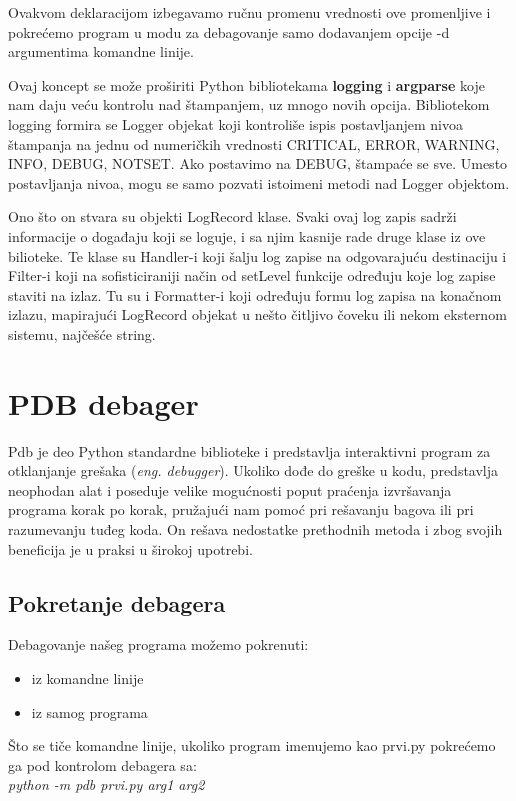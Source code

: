 \documentclass[a4paper]{article}
\begin{document}
Ovakvom deklaracijom izbegavamo ručnu promenu vrednosti ove promenljive i pokrećemo program u modu za debagovanje samo dodavanjem opcije -d argumentima komandne linije. 

Ovaj koncept se može proširiti Python bibliotekama \textbf{logging} \cite{logDocPyt} i \textbf{argparse} koje nam daju veću kontrolu nad štampanjem, uz mnogo novih opcija. Bibliotekom logging formira se Logger objekat koji kontroliše ispis postavljanjem nivoa štampanja na jednu od numeričkih vrednosti CRITICAL, ERROR, WARNING,  INFO, DEBUG, NOTSET. Ako postavimo na DEBUG, štampaće se sve. Umesto postavljanja nivoa, mogu se samo pozvati istoimeni metodi nad Logger objektom.

Ono što on stvara su objekti LogRecord klase. Svaki ovaj log zapis sadrži informacije o događaju koji se loguje, i sa njim kasnije rade druge klase iz ove bilioteke. Te klase su Handler-i koji šalju log zapise na odgovarajuću destinaciju i Filter-i koji na sofisticiraniji način od setLevel funkcije određuju koje log zapise staviti na izlaz. Tu su i Formatter-i koji određuju formu log zapisa na konačnom izlazu, mapirajući LogRecord objekat u nešto čitljivo čoveku ili nekom eksternom sistemu, najčešće string\cite{logDocPyt}. 

\section{PDB debager}
Pdb je deo Python standardne biblioteke i predstavlja interaktivni program za otklanjanje grešaka (\emph{eng. debugger})\cite{pdbDocPyt}. Ukoliko dođe do greške u kodu, predstavlja neophodan alat i poseduje velike mogućnosti poput praćenja izvršavanja programa korak po korak, pružajući nam pomoć pri rešavanju bagova ili pri razumevanju tuđeg koda. On rešava nedostatke prethodnih metoda i zbog svojih beneficija je u praksi u širokoj upotrebi.
\subsection{Pokretanje debagera}
Debagovanje našeg programa možemo pokrenuti:
\begin{itemize}
\item iz komandne linije
\item iz samog programa
\end{itemize}

Što se tiče komandne linije, ukoliko program imenujemo kao prvi.py pokrećemo ga pod kontrolom debagera sa:
\\\emph{python -m pdb prvi.py arg1 arg2}
\end{document}
